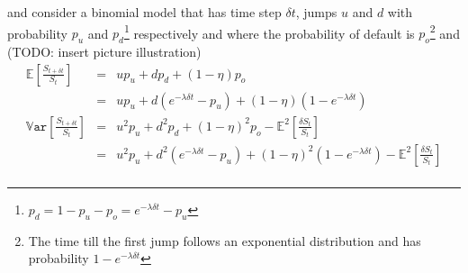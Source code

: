 \documentclass[a4paper,11pt,oneside]{report}
\theoremstyle{plain}
\theoremstyle{definition}
\def\E{\mathbb{E}}
\def\Var{\mathbb{V}\mathtt{ar}}
\def\S{\ensuremath{S_t}\xspace}
\def\DS{\ensuremath{\delta S_t}\xspace}
\def\Dt{\ensuremath{\delta t}\xspace}
\def\u{\ensuremath{u}\xspace}
\def\d{\ensuremath{d}\xspace}
\def\o{\ensuremath{o}\xspace}
\def\pu{\ensuremath{p_\u}\xspace}
\def\pd{\ensuremath{p_\d}\xspace}
\def\po{\ensuremath{p_\o}\xspace}
\begin{document}
\noindent and consider a binomial model that has time step \Dt, jumps \u and \d with probability \pu and \pd\footnote{$\pd = 1 - \pu - \po = e^{-\lambda\Dt} - \pu$} respectively and where the probability of default is \po\footnote{The time till the first jump follows an exponential distribution and has probability $1 - e^{-\lambda\Dt}$} and (TODO: insert picture illustration)
\begin{displaymath}\begin{array}{rcl}
 \E[\frac{S_{t + \Dt}}{\S}]     &=& \u\pu + \d\pd + (1 - \eta)\po \\
                                &=& \u\pu + \d(e^{-\lambda\Dt} - \pu) + (1 - \eta)(1 - e^{-\lambda\Dt}) \\
 \Var[\frac{S_{t + \Dt}}{\S}]   &=& \u^2\pu + \d^2\pd + (1 - \eta)^2\po - \E^2[\frac{\DS}{\S}] \\
                                &=& \u^2\pu + \d^2(e^{-\lambda\Dt} - \pu) + (1 - \eta)^2(1 - e^{-\lambda\Dt}) - \E^2[\frac{\DS}{\S}] \\
\end{array}\end{displaymath}
\end{document}
